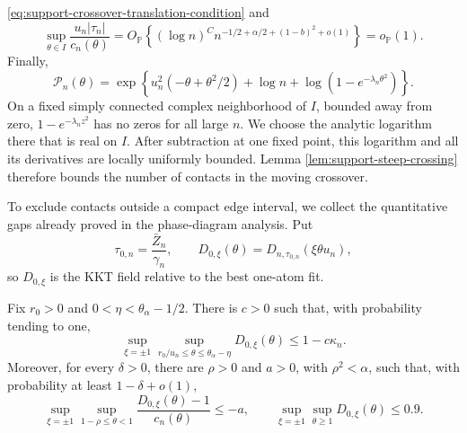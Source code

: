 \eqref{eq:support-crossover-translation-condition} and
\[
    \sup_{\theta\in I}\frac{u_n|\tau_n|}{c_n(\theta)}
    =O_{\mathbb P}\!\left\{(\log n)^C
      n^{-1/2+\alpha/2+(1-b)^2+o(1)}\right\}
    =o_{\mathbb P}(1).
\]
Finally,
\[
    \mathcal P_n(\theta)
    =\exp\left\{u_n^2(-\theta+\theta^2/2)
       +\log n+\log(1-e^{-\lambda_n\theta^2})\right\}.
\]
On a fixed simply connected complex neighborhood of \(I\), bounded away from
zero, \(1-e^{-\lambda_nz^2}\) has no zeros for all large \(n\). We choose the
analytic logarithm there that is real on \(I\). After subtraction at one fixed point, this logarithm
and all its derivatives are locally uniformly bounded. Lemma
\ref{lem:support-steep-crossing} therefore bounds the number of contacts in
the moving crossover.

To exclude contacts outside a compact edge interval, we collect the
quantitative gaps already proved in the phase-diagram analysis. Put
\[
 \tau_{0,n}=\frac{\bar Z_n}{\gamma_n},
 \qquad
 D_{0,\xi}(\theta)=D_{n,\tau_{0,n}}(\xi\theta u_n),
\]
so \(D_{0,\xi}\) is the KKT field relative to the best one-atom fit.
\begin{lemma}
\label{lem:support-one-d-exclusion-margins}
Fix \(r_0>0\) and
\(0<\eta<\theta_\alpha-1/2\). There is \(c>0\) such that, with probability
tending to one,
\[
 \sup_{\xi=\pm1}\sup_{r_0/u_n\le\theta\le\theta_\alpha-\eta}
 D_{0,\xi}(\theta)\le1-c\kappa_n.
\]
Moreover, for every \(\delta>0\), there are \(\rho>0\) and \(a>0\), with
\(\rho^2<\alpha\), such that, with probability at least
\(1-\delta+o(1)\),
\[
 \sup_{\xi=\pm1}\sup_{1-\rho\le\theta<1}
 \frac{D_{0,\xi}(\theta)-1}{c_n(\theta)}\le-a,
 \qquad
 \sup_{\xi=\pm1}\sup_{\theta\ge1}D_{0,\xi}(\theta)\le0.9.
\]
\end{lemma}

